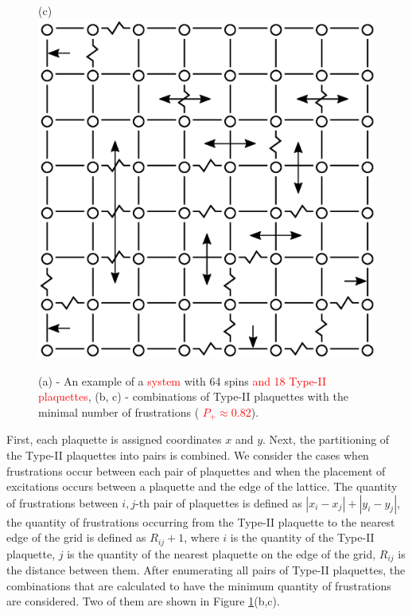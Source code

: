 \documentclass[preprint,12pt]{elsarticle}
\begin{document}
\begin{figure}[H]
\begin{minipage}[h]{0.3\linewidth}
		\end{minipage}
		\hspace{10pt}
		\begin{minipage}[h]{0.3\linewidth}
			\centering(c)
			\includegraphics[width=1\linewidth]{pictures/2PS_cell64_J72_5.eps}
		\end{minipage}
		\caption{(a) - An example of a \textcolor{red}{system} with 64 spins \textcolor{red}{and 18 Type-II plaquettes}, (b, c) - combinations of Type-II plaquettes with the minimal number of frustrations (\textcolor{red}{  $P_+\approx0.82$}).}
		\label{fig:12PS_cell64_J72_5}
	\end{figure}
	
	
	First, each plaquette is assigned coordinates $x$ and $y$. Next, the partitioning of the Type-II plaquettes into pairs is combined. We consider the cases when frustrations occur between each pair of plaquettes and when the placement of excitations occurs between a plaquette and the edge of the lattice. The quantity of frustrations between $i,j$-th pair of plaquettes is defined as $\left|x_i-x_j\right|+\left|y_i-y_j\right|$, the quantity of frustrations occurring from the Type-II plaquette to the nearest edge of the grid is defined as $R_{ij}+1$, where $i$ is the quantity of the Type-II plaquette, $j$ is the quantity of the nearest plaquette on the edge of the grid, $R_{ij}$ is the distance between them. After enumerating all pairs of Type-II plaquettes, the combinations that are calculated to have the minimum quantity of frustrations are considered. Two of them are shown in Figure \ref{fig:12PS_cell64_J72_5}(b,c).
	
\end{document}
